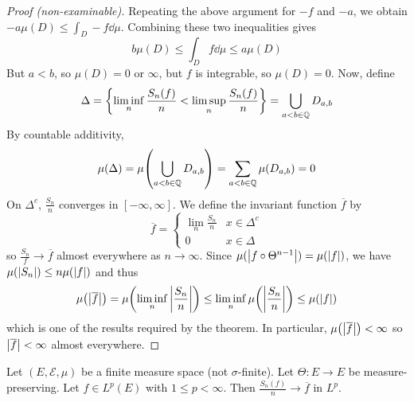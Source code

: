 \begin{proof}[Proof (non-examinable)]
    Repeating the above argument for \( -f \) and \( -a \), we obtain \( -a\mu(D) \leq \int_D -f \dd{\mu} \).
    Combining these two inequalities gives
    \[ b\mu(D) \leq \int_D f \dd{\mu} \leq a\mu(D) \]
    But \( a < b \), so \( \mu(D) = 0 \) or \( \infty \), but \( f \) is integrable, so \( \mu(D) = 0 \).
    Now, define
    \[ \Delta = \qty{\liminf_n \frac{S_n(f)}{n} < \limsup_n \frac{S_n(f)}{n}}  = \bigcup_{a < b \in \mathbb Q} D_{a,b} \]
    By countable additivity,
    \[ \mu(\Delta) = \mu\qty(\bigcup_{a < b \in \mathbb Q} D_{a,b}) = \sum_{a < b \in \mathbb Q} \mu(D_{a,b}) = 0 \]
    On \( \Delta^c \), \( \frac{S_n}{n} \) converges in \( [-\infty, \infty] \).
    We define the invariant function \( \overline f \) by
    \[ \overline f = \begin{cases}
        \lim_n \frac{S_n}{n} & x \in \Delta^c \\
        0 & x \in \Delta
    \end{cases} \]
    so \( \frac{S_n}{f} \to \overline f \) almost everywhere as \( n \to \infty \).
    Since \( \mu(\abs{f \circ \Theta^{n-1}}) = \mu(\abs{f}) \), we have \( \mu(\abs{S_n}) \leq n \mu(\abs{f}) \) and thus
    \[ \mu\qty(\abs{\overline f}) = \mu\qty(\liminf_n \abs{\frac{S_n}{n}}) \leq \liminf_n \mu\qty(\abs{\frac{S_n}{n}}) \leq \mu(\abs{f}) \]
    which is one of the results required by the theorem.
    In particular, \( \mu\qty(\abs{\overline f}) < \infty \) so \( \abs{\overline f} < \infty \) almost everywhere.
\end{proof}
\begin{theorem}
	Let \( (E, \mathcal E, \mu) \) be a finite measure space (not \( \sigma \)-finite).
	Let \( \Theta \colon E \to E \) be measure-preserving.
	Let \( f \in L^p(E) \) with \( 1 \leq p < \infty \).
	Then \( \frac{S_n(f)}{n} \to \overline f \) in \( L^p \).
\end{theorem}
